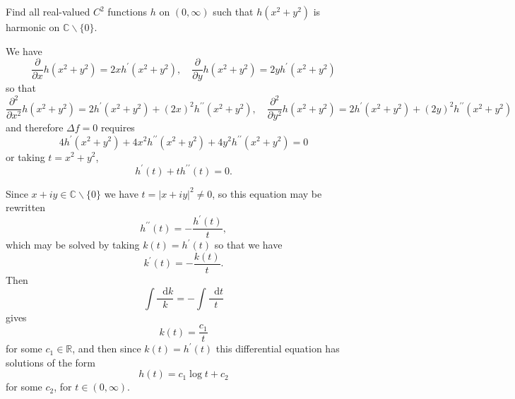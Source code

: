 \documentclass{article}
\newcommand\dif{\mathop{}\!\mathrm{d}}
\newcounter{Problem}
\newenvironment{Problem}{\begin{Exercise}[name={Problem},
                                          counter={Problem}]}
                        {\end{Exercise}}
\begin{document}
\begin{Problem}
Find all real-valued $C^2$ functions $h$ on $(0, \infty)$ such that
$h(x^2 + y^2)$ is harmonic on $\mathbb{C} \backslash \{ 0 \}$.
\end{Problem}

\begin{Answer}
We have
$$
\frac{\partial}{\partial x} h(x^2 + y^2) = 2x h^\prime(x^2 + y^2), \quad
\frac{\partial}{\partial y} h(x^2 + y^2) = 2y h^\prime(x^2 + y^2)
$$
so that
$$
  \frac{\partial^2}{\partial x^2} h(x^2 + y^2) 
= 2 h^\prime(x^2 + y^2) + (2x)^2 h^{\prime\prime}(x^2 + y^2), \quad
  \frac{\partial^2}{\partial y^2} h(x^2 + y^2)
= 2 h^\prime(x^2 + y^2) + (2y)^2 h^{\prime\prime}(x^2 + y^2)
$$
and therefore $\Delta f = 0$ requires
$$
  4 h^\prime (x^2 + y^2) 
+ 4x^2 h^{\prime\prime}(x^2 + y^2) 
+ 4y^2 h^{\prime\prime}(x^2 + y^2) = 0
$$
or taking $t = x^2 + y^2$,
$$
h^\prime(t) + t h^{\prime\prime}(t) = 0.
$$

Since 
$x + i y \in \mathbb{C} \backslash \{ 0 \}$ we have
$t = |x + iy|^2 \neq 0$,
so this equation may be rewritten
$$
h^{\prime\prime}(t) = -\frac{h^\prime(t)}{t},
$$
which may be solved by taking $k(t) = h^\prime(t)$ so that
we have
$$
k^\prime(t) = -\frac{k(t)}{t}.
$$
Then
$$
\int \frac{\dif k}{k} = -\int \frac{\dif t}{t} 
$$
gives
$$
k(t) = \frac{c_1}{t}
$$
for some $c_1 \in \mathbb{R}$, and then since $k(t) = h^\prime(t)$
this differential equation has solutions of the form
$$
h(t) = c_1 \log t + c_2
$$ 
for some $c_2$, for $t \in (0, \infty)$.
\end{Answer}
\end{document}
